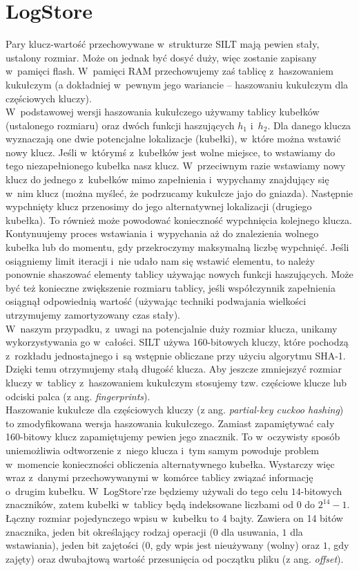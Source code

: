 \documentclass[declaration,shortabstract,masc]{iithesis}
\begin{document}
		\section{LogStore}\label{logstore}
			Pary klucz-wartość przechowywane w~strukturze SILT mają pewien stały, ustalony rozmiar. Może on jednak być dosyć duży, więc zostanie zapisany w~pamięci flash. W~pamięci RAM przechowujemy zaś tablicę z~haszowaniem kukułczym (a dokładniej w~pewnym jego wariancie -- haszowaniu kukułczym dla częściowych kluczy).\\
			\indent W~podstawowej wersji haszowania kukułczego używamy tablicy kubełków (ustalonego rozmiaru) oraz dwóch funkcji haszujących $h_1$ i~$h_2$. Dla danego klucza wyznaczają one dwie potencjalne lokalizacje (kubełki), w~które można wstawić nowy klucz. Jeśli w~którymś z~kubełków jest wolne miejsce, to wstawiamy do tego niezapełnionego kubełka nasz klucz. W~przeciwnym razie wstawiamy nowy klucz do jednego z~kubełków mimo zapełnienia i~wypychamy znajdujący się w~nim klucz (można myśleć, że podrzucamy kukułcze jajo do gniazda). Następnie wypchnięty klucz przenosimy do jego alternatywnej lokalizacji (drugiego kubełka). To również może powodować konieczność wypchnięcia kolejnego klucza. Kontynuujemy proces wstawiania i~wypychania aż do znalezienia wolnego kubełka lub do momentu, gdy przekroczymy maksymalną liczbę wypchnięć. Jeśli osiągniemy limit iteracji i~nie udało nam się wstawić elementu, to należy ponownie shaszować elementy tablicy używając nowych funkcji haszujących. Może być też konieczne zwiększenie rozmiaru tablicy, jeśli współczynnik zapełnienia osiągnął odpowiednią wartość (używając techniki podwajania wielkości utrzymujemy zamortyzowany czas stały).\\
			\indent W~naszym przypadku, z~uwagi na potencjalnie duży rozmiar klucza, unikamy wykorzystywania go w~całości. SILT używa 160-bitowych kluczy, które pochodzą z~rozkładu jednostajnego i~są wstępnie obliczane przy użyciu algorytmu SHA-1. Dzięki temu otrzymujemy stałą długość klucza. Aby jeszcze zmniejszyć rozmiar kluczy w~tablicy z~haszowaniem kukułczym stosujemy tzw. częściowe klucze lub odciski palca (z ang. \textit{fingerprints}).\\
			\indent Haszowanie kukułcze dla częściowych kluczy (z ang. \textit{partial-key cuckoo hashing}) \cite{PKCH} to zmodyfikowana wersja haszowania kukułczego. Zamiast zapamiętywać cały 160-bitowy klucz zapamiętujemy pewien jego znacznik. To w~oczywisty sposób uniemożliwia odtworzenie z~niego klucza i~tym samym powoduje problem w~momencie konieczności obliczenia alternatywnego kubełka. Wystarczy więc wraz z~danymi przechowywanymi w~komórce tablicy związać informację o~drugim kubełku. W~LogStore'rze będziemy używali do tego celu $14$-bitowych znaczników, zatem kubełki w~tablicy będą indeksowane liczbami od $0$ do $2^{14} - 1$. Łączny rozmiar pojedynczego wpisu w~kubełku to 4 bajty. Zawiera on 14 bitów znacznika, jeden bit określający rodzaj operacji ($0$ dla usuwania, $1$ dla wstawiania), jeden bit zajętości ($0$, gdy wpis jest nieużywany (wolny) oraz $1$, gdy zajęty) oraz dwubajtową wartość przesunięcia od początku pliku (z ang. \textit{offset}).\\
\end{document}
